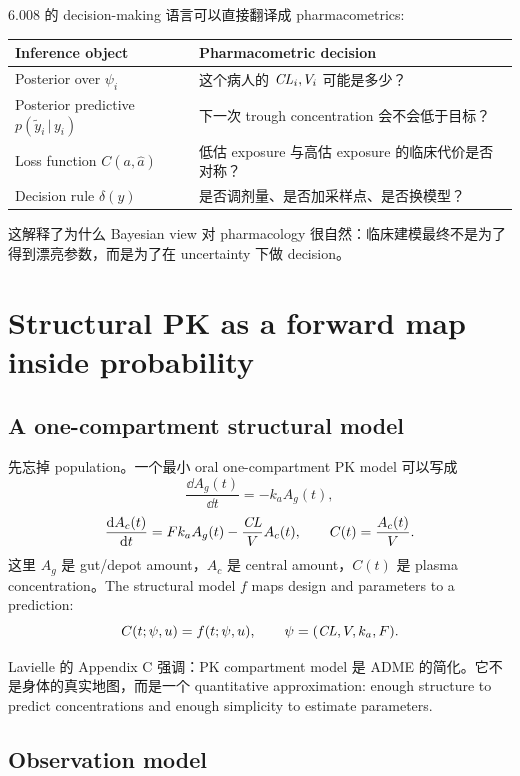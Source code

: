 \documentclass[a4paper]{article}
\newcommand{\given}{\,|\,}
\begin{document}
6.008 的 decision-making 语言可以直接翻译成 pharmacometrics:

\begin{center}
\begin{tabularx}{0.96\textwidth}{p{}X}
\toprule
Inference object & Pharmacometric decision \\
\midrule
Posterior over \(\psi_i\) & 这个病人的 \(\pksym{CL}_i,V_i\) 可能是多少？\\
Posterior predictive \(p(\tilde y_i\given y_i)\) & 下一次 trough concentration 会不会低于目标？\\
Loss function \(C(a,\widehat a)\) & 低估 exposure 与高估 exposure 的临床代价是否对称？\\
Decision rule \(\delta(y)\) & 是否调剂量、是否加采样点、是否换模型？\\
\bottomrule
\end{tabularx}
\end{center}

这解释了为什么 Bayesian view 对 pharmacology 很自然：临床建模最终不是为了得到漂亮参数，而是为了在 uncertainty 下做 decision。

\section{Structural PK as a forward map inside probability}

\subsection{A one-compartment structural model}

先忘掉 population。一个最小 oral one-compartment PK model 可以写成
\[
  \frac{\dd A_g(t)}{\dd t} = -k_a A_g(t),
\]
\[
  \frac{\dd A_c(t)}{\dd t}
  =
  F k_a A_g(t) - \frac{\pksym{CL}}{V}A_c(t),
  \qquad
  C(t)=\frac{A_c(t)}{V}.
\]
这里 \(A_g\) 是 gut/depot amount，\(A_c\) 是 central amount，\(C(t)\) 是 plasma concentration。The structural model \(f\) maps design and parameters to a prediction:
\[
  C(t;\psi,u)=f(t;\psi,u), \qquad
  \psi=(\pksym{CL},V,k_a,F).
\]

\begin{remark}
  Lavielle 的 Appendix C 强调：PK compartment model 是 ADME 的简化。它不是身体的真实地图，而是一个 quantitative approximation: enough structure to predict concentrations and enough simplicity to estimate parameters.
\end{remark}

\subsection{Observation model}
\end{document}
